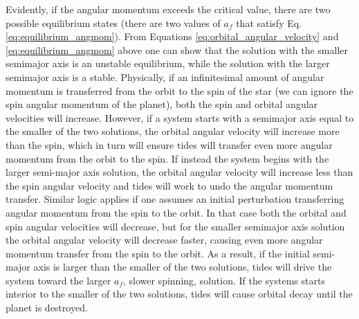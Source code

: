 Evidently, if the angular momentum exceeds the critical value, there are two
possible equilibrium states (there are two values of $a_f$ that satisfy Eq.
\eqref{eq:equilibrium_angmom}). From Equations
\eqref{eq:orbital_angular_velocity} and \eqref{eq:equilibrium_angmom} above one
can show that the solution with the smaller semimajor axis is an unstable
equilibrium, while the solution with the larger semimajor axis is a stable.
Physically, if an infinitesimal amount of angular momentum is transferred from
the orbit to the spin of the star (we can ignore the spin angular momentum of
the planet), both the spin and orbital angular velocities will increase.
However, if a system starts with a semimajor axis equal to the smaller of the
two solutions, the orbital angular velocity will increase more than the spin,
which in turn will ensure tides will transfer even more angular momentum from
the orbit to the spin. If instead the system begins with the larger semi-major
axis solution, the orbital angular velocity will increase less than the spin
angular velocity and tides will work to undo the angular momentum transfer.
Similar logic applies if one assumes an initial perturbation transferring
angular momentum from the spin to the orbit. In that case both the orbital and
spin angular velocities will decrease, but for the smaller semimajor axis
solution the orbital angular velocity will decrease faster, causing even more
angular momentum transfer from the spin to the orbit. As a result, if the
initial semi-major axis is larger than the smaller of the two solutions, tides
will drive the system toward the larger $a_f$, slower spinning, solution. If the
systems starts interior to the smaller of the two solutions, tides will cause
orbital decay until the planet is destroyed.

